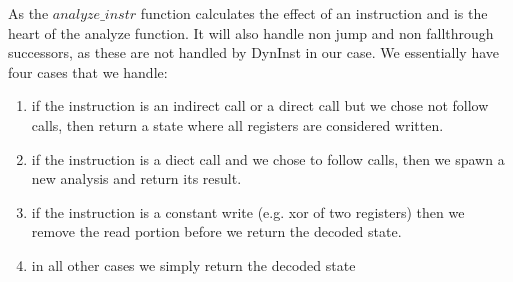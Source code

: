 
As the $analyze\_instr$ function calculates the effect of an instruction and is the heart of the analyze function. It will also handle non jump and non fallthrough successors, as these are not handled by DynInst in our case. We essentially have four cases that we handle:
\begin{enumerate}
\item if the instruction is an indirect call or a direct call but we chose not follow calls, then return a state where all registers are considered written.
\item if the instruction is a diect call and we chose to follow calls, then we spawn a new analysis and return its result.
\item if the instruction is a constant write (e.g. xor of two registers) then we remove the read portion before we return the decoded state.
\item in all other cases we simply return the decoded state
\end{enumerate}


